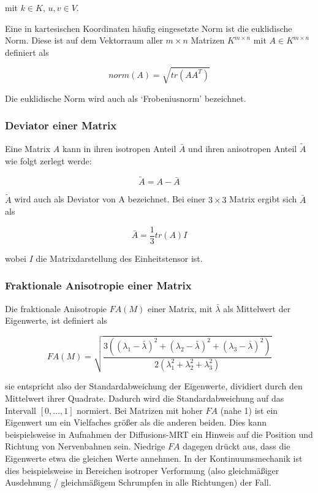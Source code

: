 \documentclass[a4paper,fontsize=12pt,toc=bib,halfparskip]{scrartcl}
\begin{document}
mit $k \in K$, $u,v \in V$.


Eine in kartesischen Koordinaten h\"aufig eingesetzte Norm ist die euklidische Norm. Diese ist auf dem Vektorraum aller $m \times n$ Matrizen $K^{m\times n}$ mit $A \in K^{m\times n}$ definiert als

\begin{equation}
	norm(A) = \sqrt{tr(AA^T)}
\end{equation}

Die euklidische Norm wird auch als `Frobeniusnorm' bezeichnet.

\subsubsection{Deviator einer Matrix}
Eine Matrix $A$ kann in ihren isotropen Anteil $\bar{A}$ und ihren anisotropen Anteil $\tilde{A}$ wie folgt zerlegt werde:

\begin{equation}
\tilde{A} = A - \bar{A}
\end{equation}

$\tilde{A}$ wird auch als Deviator von A bezeichnet. Bei einer $3\times 3$ Matrix ergibt sich $\bar{A}$ als

\begin{equation}
\bar{A} = \frac{1}{3}tr(A)I
\end{equation}

wobei $I$ die Matrixdarstellung des Einheitstensor ist.

\subsubsection{Fraktionale Anisotropie einer Matrix}
Die fraktionale Anisotropie $FA(M)$ einer Matrix, mit $\bar{\lambda}$ als Mittelwert der Eigenwerte, ist definiert als

\begin{equation}
	FA(M) = \sqrt{\frac{3((\lambda_1 - \bar{\lambda})^2 + (\lambda_2 - \bar{\lambda})^2 + (\lambda_3 - \bar{\lambda})^2)}{2(\lambda_1^2 + \lambda_2^2 + \lambda_3^2)}}
\end{equation}

sie entspricht also der Standardabweichung der Eigenwerte, dividiert durch den Mittelwert ihrer Quadrate. Dadurch wird die Standardabweichung auf das Intervall $[0,\dots,1]$ normiert. Bei Matrizen mit hoher $FA$ (nahe 1) ist ein Eigenwert um ein Vielfaches gr\"o{\ss}er als die anderen beiden. Dies kann beispielsweise in Aufnahmen der Diffusions-MRT ein Hinweis auf die Position und Richtung von Nervenbahnen sein. Niedrige $FA$ dagegen dr\"uckt aus, dass die Eigenwerte etwa die gleichen Werte annehmen. In der Kontinuumsmechanik ist dies beispielsweise in Bereichen isotroper Verformung (also gleichm\"a{\ss}iger Ausdehnung / gleichm\"a{\ss}igem Schrumpfen in alle Richtungen) der Fall.
\end{document}
